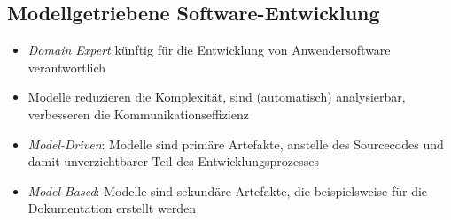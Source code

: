 \subsection{Modellgetriebene Software-Entwicklung}
\begin{itemize}
	\item \textit{Domain Expert} künftig für die Entwicklung von Anwendersoftware verantwortlich
	\item Modelle reduzieren die Komplexität, sind (automatisch) analysierbar, verbesseren die Kommunikationseffizienz
	\item \textit{Model-Driven}: Modelle sind primäre Artefakte, anstelle des Sourcecodes und damit unverzichtbarer Teil des Entwicklungsprozesses
	\item \textit{Model-Based}: Modelle sind sekundäre Artefakte, die beispielsweise für die Dokumentation erstellt werden
\end{itemize}

